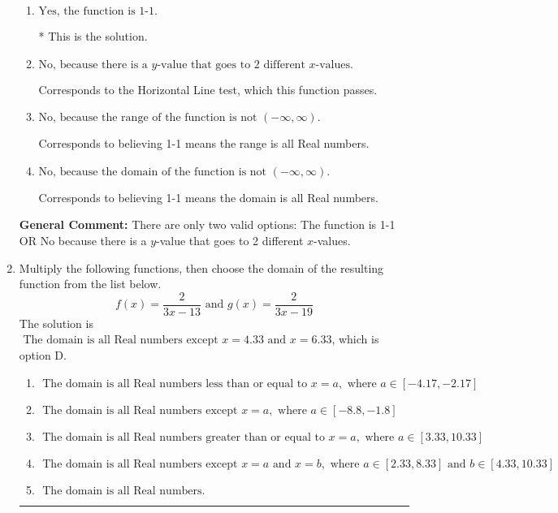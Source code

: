 \documentclass{extbook}[14pt]
\newcommand{\litem}[1]{\item #1

\rule{\textwidth}{0.4pt}}
\begin{document}
\begin{enumerate}
{\begin{enumerate}[label=\Alph*.]
Corresponds to the Vertical Line test, which checks if an expression is a function.
\item \( \text{Yes, the function is 1-1.} \)

* This is the solution.
\item \( \text{No, because there is a $y$-value that goes to 2 different $x$-values.} \)

Corresponds to the Horizontal Line test, which this function passes.
\item \( \text{No, because the range of the function is not $(-\infty, \infty)$.} \)

Corresponds to believing 1-1 means the range is all Real numbers.
\item \( \text{No, because the domain of the function is not $(-\infty, \infty)$.} \)

Corresponds to believing 1-1 means the domain is all Real numbers.
\end{enumerate}

\textbf{General Comment:} There are only two valid options: The function is 1-1 OR No because there is a $y$-value that goes to 2 different $x$-values.
}
\litem{
Multiply the following functions, then choose the domain of the resulting function from the list below.
\[ f(x) = \frac{2}{3x-13} \text{ and } g(x) = \frac{2}{3x-19} \]The solution is \( \text{ The domain is all Real numbers except } x = 4.33 \text{ and } x = 6.33 \), which is option D.\begin{enumerate}[label=\Alph*.]
\item \( \text{ The domain is all Real numbers less than or equal to } x = a, \text{ where } a \in [-4.17, -2.17] \)


\item \( \text{ The domain is all Real numbers except } x = a, \text{ where } a \in [-8.8, -1.8] \)


\item \( \text{ The domain is all Real numbers greater than or equal to } x = a, \text{ where } a \in [3.33, 10.33] \)


\item \( \text{ The domain is all Real numbers except } x = a \text{ and } x = b, \text{ where } a \in [2.33, 8.33] \text{ and } b \in [4.33, 10.33] \)


\item \( \text{ The domain is all Real numbers. } \)


\end{enumerate}

}
\end{enumerate}
\end{document}
